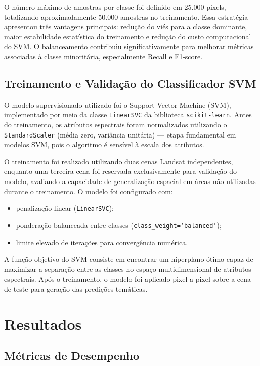 \documentclass[conference]{IEEEtran}
\begin{document}
O número máximo de amostras por classe foi definido em 25.000 pixels,
totalizando aproximadamente 50.000 amostras no treinamento. Essa estratégia
apresentou três vantagens principais: redução do viés para a classe dominante,
maior estabilidade estatística do treinamento e redução do custo computacional
do SVM. O balanceamento contribuiu significativamente para melhorar métricas
associadas à classe minoritária, especialmente Recall e F1-score.

\subsection{Treinamento e Validação do Classificador SVM}

O modelo supervisionado utilizado foi o Support Vector Machine (SVM),
implementado por meio da classe \texttt{LinearSVC} da biblioteca
\texttt{scikit-learn}. Antes do treinamento, os atributos espectrais foram
normalizados utilizando o \texttt{StandardScaler} (média zero, variância
unitária) — etapa fundamental em modelos SVM, pois o algoritmo é sensível
à escala dos atributos.

O treinamento foi realizado utilizando duas cenas Landsat independentes,
enquanto uma terceira cena foi reservada exclusivamente para validação do
modelo, avaliando a capacidade de generalização espacial em áreas não
utilizadas durante o treinamento. O modelo foi configurado com:

\begin{itemize}
  \item penalização linear (\texttt{LinearSVC});
  \item ponderação balanceada entre classes
        (\texttt{class\_weight='balanced'});
  \item limite elevado de iterações para convergência numérica.
\end{itemize}

A função objetivo do SVM consiste em encontrar um hiperplano ótimo capaz de
maximizar a separação entre as classes no espaço multidimensional de atributos
espectrais. Após o treinamento, o modelo foi aplicado pixel a pixel sobre a
cena de teste para geração das predições temáticas.

\section{Resultados}

\subsection{Métricas de Desempenho}
\end{document}
